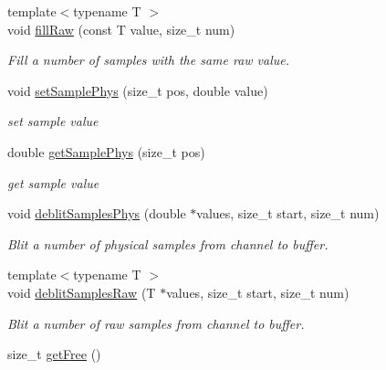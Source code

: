 \begin{DoxyCompactItemize}
{\footnotesize template$<$typename T $>$ }\\void \hyperlink{classgdf_1_1_channel_a8c94145830b7f3de1413a7c79bd791dd}{fillRaw} (const T value, size\_\-t num)
\begin{DoxyCompactList}\small\item\em Fill a number of samples with the same raw value. \item\end{DoxyCompactList}\item 
\hypertarget{classgdf_1_1_channel_a5e11e8837429d02fc4e88c4293e49d19}{
void \hyperlink{classgdf_1_1_channel_a5e11e8837429d02fc4e88c4293e49d19}{setSamplePhys} (size\_\-t pos, double value)}
\label{classgdf_1_1_channel_a5e11e8837429d02fc4e88c4293e49d19}

\begin{DoxyCompactList}\small\item\em set sample value \item\end{DoxyCompactList}\item 
\hypertarget{classgdf_1_1_channel_af332515256e6cc82e8638dc13305c96f}{
double \hyperlink{classgdf_1_1_channel_af332515256e6cc82e8638dc13305c96f}{getSamplePhys} (size\_\-t pos)}
\label{classgdf_1_1_channel_af332515256e6cc82e8638dc13305c96f}

\begin{DoxyCompactList}\small\item\em get sample value \item\end{DoxyCompactList}\item 
void \hyperlink{classgdf_1_1_channel_a12b0aac7591e46cd0bb9bad0d683d1b5}{deblitSamplesPhys} (double $\ast$values, size\_\-t start, size\_\-t num)
\begin{DoxyCompactList}\small\item\em Blit a number of physical samples from channel to buffer. \item\end{DoxyCompactList}\item 
\hypertarget{classgdf_1_1_channel_a280b7c8bddfadc3b8a587b0344750d62}{
{\footnotesize template$<$typename T $>$ }\\void \hyperlink{classgdf_1_1_channel_a280b7c8bddfadc3b8a587b0344750d62}{deblitSamplesRaw} (T $\ast$values, size\_\-t start, size\_\-t num)}
\label{classgdf_1_1_channel_a280b7c8bddfadc3b8a587b0344750d62}

\begin{DoxyCompactList}\small\item\em Blit a number of raw samples from channel to buffer. \item\end{DoxyCompactList}\item 
\hypertarget{classgdf_1_1_channel_a394ca2e97a35c0acc4c9af45e7d7bc3f}{
size\_\-t \hyperlink{classgdf_1_1_channel_a394ca2e97a35c0acc4c9af45e7d7bc3f}{getFree} ()}
\label{classgdf_1_1_channel_a394ca2e97a35c0acc4c9af45e7d7bc3f}


\end{DoxyCompactItemize}
